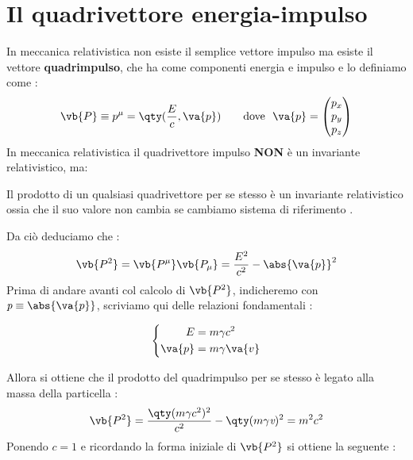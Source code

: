 \documentclass[a4paper, 12pt, twoside]{report}
\begin{document}
\chapter{Il quadrivettore energia-impulso}
In meccanica relativistica non esiste il semplice vettore impulso ma esiste il vettore \textbf{quadrimpulso}, che ha come componenti energia e impulso 
e lo definiamo come : 
\begin{align*}
        \vb{P} \equiv p^{\mu} = \qty(\frac{E}{c}, \va{p}) \tag*{dove \ $ \va{p} = \begin{pmatrix} p_{x} \\ p_{y} \\ p_{z} \end{pmatrix}$} 
\end{align*}
In meccanica relativistica il quadrivettore impulso \textbf{NON} è un invariante relativistico, ma: 
\\
\begin{tcolorbox}[colback=red!5!white,colframe=red!50!black,title=ATTENZIONE !]
Il prodotto di un qualsiasi quadrivettore per se stesso è un invariante relativistico ossia che il suo valore non cambia se cambiamo sistema di riferimento . 
\end{tcolorbox}
Da ciò deduciamo che :
\begin{align*}
        \vb{P^{2}} = \vb{P^{\mu}}\vb{P_{\mu}} = \frac{E^{2}}{c^2} - \abs{\va{p}}^2
\end{align*}
Prima di andare avanti col calcolo di $\vb{P^{2}}$, indicheremo con $\textit{p} \equiv \abs{\va{p}}$, scriviamo qui delle relazioni fondamentali : \\
\begin{tcolorbox}[colback=red!5!white,colframe=red!50!black,title=ATTENZIONE !]
\begin{equation*}
        \left\{ \begin{aligned}
                        E &= m\gamma c^{2} \\
                        \va{p} &= m\gamma\va{v} 
                \end{aligned}
                \right.
\end{equation*}
\end{tcolorbox}
Allora si ottiene che il prodotto del quadrimpulso per se stesso è legato alla massa della particella : 
\begin{align*}
        \vb{P^2} = \frac{\qty(m\gamma c^{2})^2}{c^2} - \qty(m\gamma\textit{v})^2 = m^2c^2
\end{align*}
\newpage
Ponendo $c = 1$ e ricordando la forma iniziale di $\vb{P^2}$ si ottiene la seguente : \\
\end{document}
